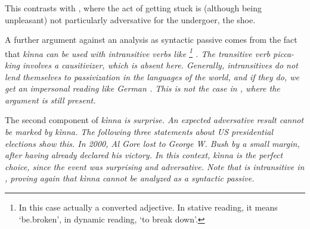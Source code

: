 This contrasts with , where the act of getting stuck is (although being unpleasant) not particularly adversative for the undergoer, the shoe.



A further argument against an analysis as syntactic passive comes from the fact that \em kìnna \em can be used with intransitive verbs like \footnote{In this case actually a converted adjective. In stative reading, it means `be.broken', in dynamic reading, `to break down'.} . The transitive verb \em picca-king \em involves a causitivizer, which is absent here. Generally, intransitives do not lend themselves to passivization in the languages of the world, and if they do, we get an impersonal reading like German  \citep[cf.][325]{FoleyEtAl1985infpack}. This is not the case in , where the argument  is still present.



The second component of \em kìnna \em is surprise. An expected adversative result cannot be marked by \em kìnna\em. The following three statements about US presidential elections show this. In 2000, Al Gore lost to George W. Bush by a small margin, after having already declared his victory. In this context, \em kìnna \em is the perfect choice, since the event was surprising and adversative. Note that  is intransitive in , proving again that  \em kìnna \em cannot be analyzed as a syntactic passive.



